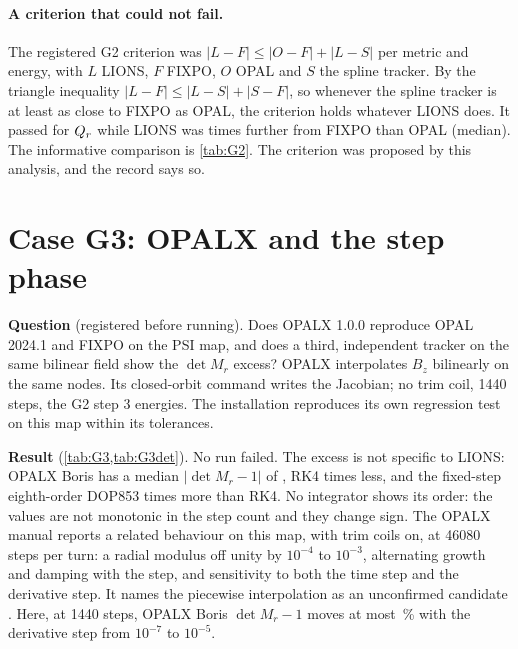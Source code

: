 \begin{table}[h]
\centering\small
\caption{Case G2: $\det M_r - 1$ of the radial block at three energies, Jacobian step \SI{1e-6}{m}.}
\label{tab:G2det}

\end{table}

\paragraph{A criterion that could not fail.}
The registered G2 criterion was $|L-F|\le|O-F|+|L-S|$ per metric and energy, with $L$ LIONS, $F$ FIXPO, $O$ OPAL and $S$
the spline tracker.
By the triangle inequality $|L-F|\le|L-S|+|S-F|$, so whenever the spline tracker is at least as close to FIXPO as OPAL,
the criterion holds whatever LIONS does.
It passed for $Q_r$ while LIONS was \GPsiLionsOverOpal{} times further from FIXPO than OPAL (median).
The informative comparison is \cref{tab:G2}.
The criterion was proposed by this analysis, and the record says so.

\section{Case G3: OPALX and the step phase}\label{sec:caseG3}
\textbf{Question} (registered before running).
Does OPALX 1.0.0 \cite{opalx2026} reproduce OPAL 2024.1 and FIXPO on the PSI map, and does a third, independent tracker on the same bilinear field show the $\det M_r$ excess?
OPALX interpolates $B_z$ bilinearly on the same nodes.
Its closed-orbit command writes the Jacobian; no trim coil, 1440 steps, the G2 step 3 energies.
The installation reproduces its own regression test on this map within its tolerances.

\textbf{Result} (\cref{tab:G3,tab:G3det}).
No run failed.
The excess is not specific to LIONS: OPALX Boris has a median $|\det M_r-1|$ of \GThreeBorisDet{}, RK4 \GThreeBorisOverRk{} times less, and the fixed-step eighth-order DOP853 \GThreeDopOverRk{} times more than RK4.
No integrator shows its order: the values are not monotonic in the step count and they change sign.
The OPALX manual reports a related behaviour on this map, with trim coils on, at 46080 steps per turn: a radial modulus off unity by $10^{-4}$ to $10^{-3}$, alternating growth and damping with the step, and sensitivity to both the time step and the derivative step.
It names the piecewise interpolation as an unconfirmed candidate \cite{opalx2026}.
Here, at 1440 steps, OPALX Boris $\det M_r - 1$ moves at most \GThreeFdVar\,\% with the derivative step from $10^{-7}$ to $10^{-5}$.


